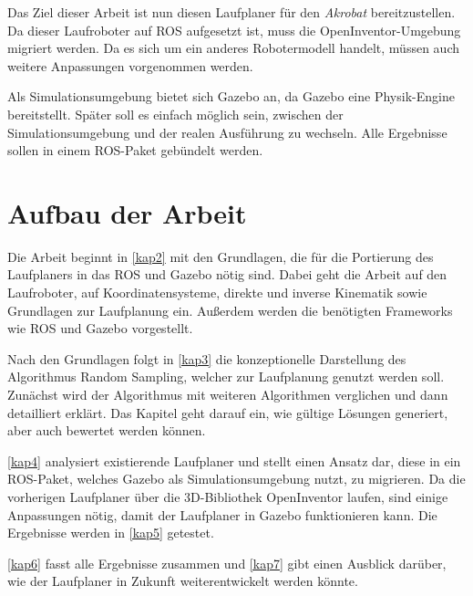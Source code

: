 Das Ziel dieser Arbeit ist nun diesen Laufplaner für den \emph{Akrobat} bereitzustellen. Da dieser Laufroboter auf \ac{ROS} aufgesetzt ist, muss die OpenInventor-Umgebung migriert werden. Da es sich um ein anderes Robotermodell handelt, müssen auch weitere Anpassungen vorgenommen werden.

Als Simulationsumgebung bietet sich Gazebo an, da Gazebo eine Physik-Engine bereitstellt. Später soll es einfach möglich sein, zwischen der Simulationsumgebung und der realen Ausführung zu wechseln. Alle Ergebnisse sollen in einem \ac{ROS}-Paket gebündelt werden.

\section{Aufbau der Arbeit}

Die Arbeit beginnt in \autoref{kap2} mit den Grundlagen, die für die Portierung des Laufplaners in das \ac{ROS} und Gazebo nötig sind. Dabei geht die Arbeit auf den Laufroboter, auf Koordinatensysteme, direkte und inverse Kinematik sowie Grundlagen zur Laufplanung ein. Außerdem werden die benötigten Frameworks wie \ac{ROS} und Gazebo vorgestellt.

Nach den Grundlagen folgt in \autoref{kap3} die konzeptionelle Darstellung des Algorithmus Random Sampling, welcher zur Laufplanung genutzt werden soll. Zunächst wird der Algorithmus mit weiteren Algorithmen verglichen und dann detailliert erklärt. Das Kapitel geht darauf ein, wie gültige Lösungen generiert, aber auch bewertet werden können.

\autoref{kap4} analysiert existierende Laufplaner und stellt einen Ansatz dar, diese in ein \ac{ROS}-Paket, welches Gazebo als Simulationsumgebung nutzt, zu migrieren. Da die vorherigen Laufplaner über die 3D-Bibliothek OpenInventor laufen, sind einige Anpassungen nötig, damit der Laufplaner in Gazebo funktionieren kann. Die Ergebnisse werden in \autoref{kap5} getestet.

\autoref{kap6} fasst alle Ergebnisse zusammen und \autoref{kap7} gibt einen Ausblick darüber, wie der Laufplaner in Zukunft weiterentwickelt werden könnte.